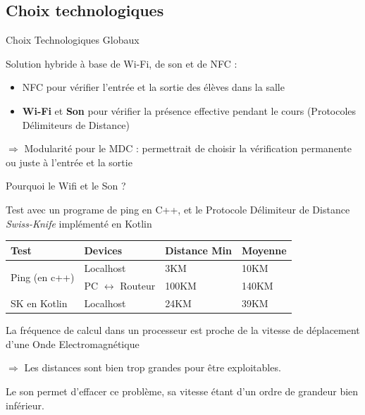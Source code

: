 \documentclass[aspectratio=169]{beamer}
\begin{document}
\subsection{Choix technologiques}

\begin{frame}{Choix Technologiques Globaux}

  Solution hybride à base de Wi-Fi, de son et de NFC :
  \begin{itemize}
    \item NFC pour vérifier l'entrée et la sortie des élèves dans la salle
    \item \textbf{Wi-Fi} et \textbf{Son} pour vérifier la présence effective pendant le cours (Protocoles Délimiteurs de Distance)
  \end{itemize}

  \bigskip
  
  $\Rightarrow$ Modularité pour le MDC : permettrait de choisir la vérification permanente ou juste à l'entrée et la sortie


\end{frame}

\begin{frame}{Pourquoi le Wifi et le Son ?}

  Test avec un programe de ping en C++, et le Protocole Délimiteur de Distance \textit{Swiss-Knife} implémenté en Kotlin

  \begin{table}[]
    \centering
    \begin{tabular}{|l|l|l|l|}
    \hline
    \textbf{Test}                                        & \textbf{Devices}             & \textbf{Distance Min} & \textbf{Moyenne} \\ \hline
    \multicolumn{1}{|c|}{\multirow{2}{*}{Ping (en c++)}} & Localhost                    & 3KM                   & 10KM             \\ \cline{2-4} 
    \multicolumn{1}{|c|}{}                               & PC $\leftrightarrow$ Routeur & 100KM                 & 140KM            \\ \hline
    SK en Kotlin                                         & Localhost                    & 24KM                  & 39KM             \\ \hline
    \end{tabular}
  \end{table}

  \bigskip

  La fréquence de calcul dans un processeur est proche de la vitesse de déplacement d'une Onde Electromagnétique
  
  $\Rightarrow$ Les distances sont bien trop grandes pour être exploitables.

  \bigskip

  Le son permet d'effacer ce problème, sa vitesse étant d'un ordre de grandeur bien inférieur.

\end{frame}
\end{document}
